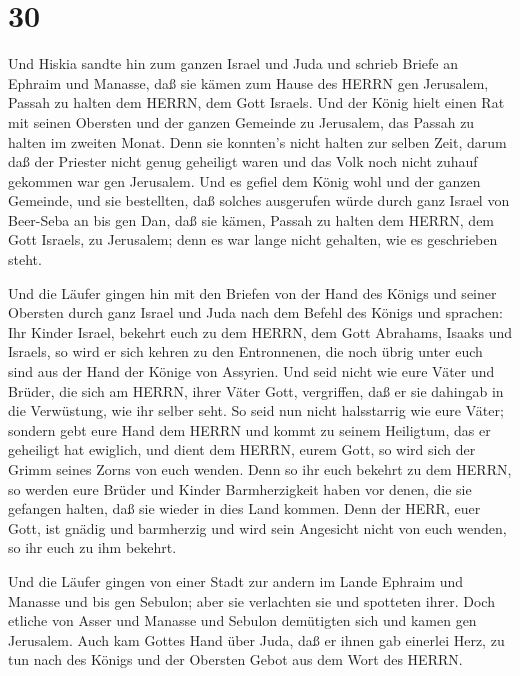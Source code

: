 \hypertarget{section-29}{%
\section{30}\label{section-29}}

 Und Hiskia sandte hin zum ganzen Israel und Juda und
schrieb Briefe an Ephraim und Manasse, daß sie kämen zum Hause des HERRN
gen Jerusalem, Passah zu halten dem HERRN, dem Gott Israels.
 Und der König hielt einen Rat mit seinen Obersten und der
ganzen Gemeinde zu Jerusalem, das Passah zu halten im zweiten Monat.
 Denn sie konnten's nicht halten zur selben Zeit, darum daß
der Priester nicht genug geheiligt waren und das Volk noch nicht zuhauf
gekommen war gen Jerusalem.  Und es gefiel dem König wohl
und der ganzen Gemeinde,  und sie bestellten, daß solches
ausgerufen würde durch ganz Israel von Beer-Seba an bis gen Dan, daß sie
kämen, Passah zu halten dem HERRN, dem Gott Israels, zu Jerusalem; denn
es war lange nicht gehalten, wie es geschrieben steht.

 Und die Läufer gingen hin mit den Briefen von der Hand des
Königs und seiner Obersten durch ganz Israel und Juda nach dem Befehl
des Königs und sprachen: Ihr Kinder Israel, bekehrt euch zu dem HERRN,
dem Gott Abrahams, Isaaks und Israels, so wird er sich kehren zu den
Entronnenen, die noch übrig unter euch sind aus der Hand der Könige von
Assyrien.  Und seid nicht wie eure Väter und Brüder, die
sich am HERRN, ihrer Väter Gott, vergriffen, daß er sie dahingab in die
Verwüstung, wie ihr selber seht.  So seid nun nicht
halsstarrig wie eure Väter; sondern gebt eure Hand dem HERRN und kommt
zu seinem Heiligtum, das er geheiligt hat ewiglich, und dient dem HERRN,
eurem Gott, so wird sich der Grimm seines Zorns von euch wenden.
 Denn so ihr euch bekehrt zu dem HERRN, so werden eure
Brüder und Kinder Barmherzigkeit haben vor denen, die sie gefangen
halten, daß sie wieder in dies Land kommen. Denn der HERR, euer Gott,
ist gnädig und barmherzig und wird sein Angesicht nicht von euch wenden,
so ihr euch zu ihm bekehrt.

 Und die Läufer gingen von einer Stadt zur andern im Lande
Ephraim und Manasse und bis gen Sebulon; aber sie verlachten sie und
spotteten ihrer.  Doch etliche von Asser und Manasse und
Sebulon demütigten sich und kamen gen Jerusalem.  Auch kam
Gottes Hand über Juda, daß er ihnen gab einerlei Herz, zu tun nach des
Königs und der Obersten Gebot aus dem Wort des HERRN.

